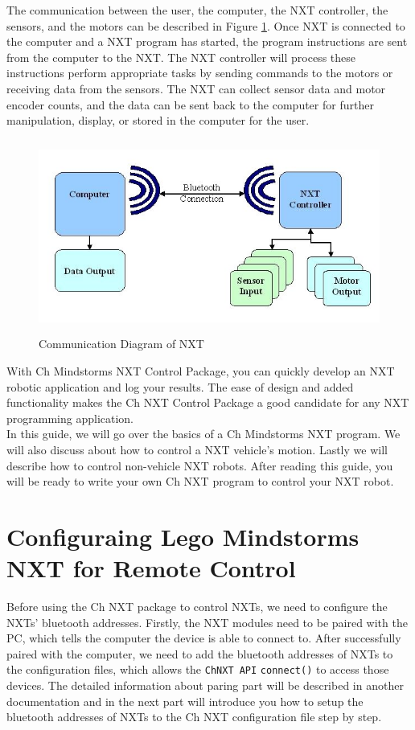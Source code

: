 \documentclass[11pt]{article}
\begin{document}
The communication between the user, the computer, the NXT controller, the sensors, and the motors can
be described in Figure \ref{fig_NXT_comm}. Once NXT is connected to the computer and a NXT program 
has started, the program instructions are sent from the computer to the NXT. The NXT controller will 
process these instructions perform appropriate tasks by sending commands to the motors or receiving 
data from the sensors. The NXT can collect sensor data and motor encoder counts, and the data can be 
sent back to the computer for further manipulation, display, or stored in the computer for the user.\\

\begin{figure}[h]
  \begin{center}
    \includegraphics[height=2.5in]{figure/mindstorm/NXT_connect.png}
    \caption{Communication Diagram of NXT\label{fig_NXT_comm}}
  \end{center}
\end{figure}

With Ch Mindstorms NXT Control Package, you can quickly develop an NXT robotic application and log 
your results. The ease of design and added functionality makes the Ch NXT Control Package a good 
candidate for any NXT programming application.\\

In this guide, we will go over the basics of a Ch Mindstorms NXT program. We will also discuss 
about how to control a NXT vehicle's motion. Lastly we will describe how to control non-vehicle
NXT robots. After reading this guide, you will be ready to write your own Ch NXT program to 
control your NXT robot.

\newpage
\section{Configuraing Lego Mindstorms NXT for Remote Control}
Before using the Ch NXT package to control NXTs, we need to configure the NXTs' bluetooth addresses.
Firstly, the NXT modules need to be paired with the PC, which tells the computer the device is able
to connect to. After successfully paired with the computer, we need to add the bluetooth addresses of
NXTs to the configuration files, which allows the \texttt{ChNXT API} \texttt{connect()} to access
those devices. The detailed information about paring part will be described in another documentation
and in the next part will introduce you how to setup the bluetooth addresses of NXTs to the Ch NXT
configuration file step by step.
\end{document}
